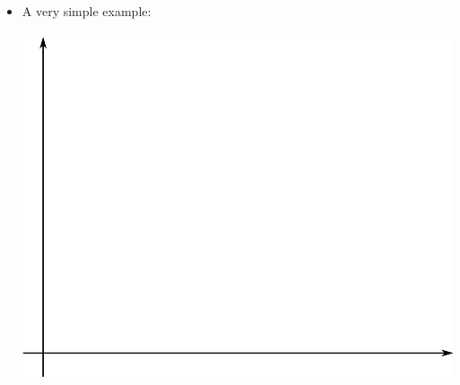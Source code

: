 \documentclass[11pt]{article}
\begin{document}
\begin{enumerate}
\begin{itemize}
					\item A very simple example:\\\\
					\includegraphics[scale=.45]{lecture1_fig2.png}
			\end{itemize}
			

\end{enumerate}
\end{document}
